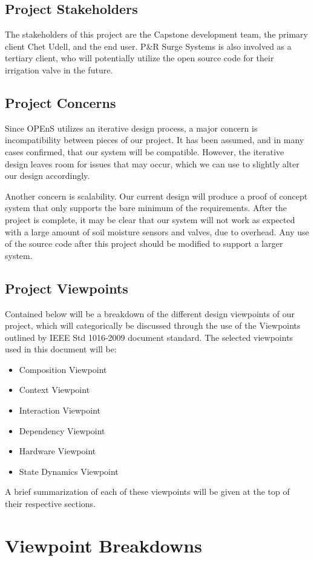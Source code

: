 \documentclass[onecolumn, draftclsnofoot,10pt, compsoc]{IEEEtran}
\begin{document}
	\subsection{Project Stakeholders}
	The stakeholders of this project are the Capstone development team, the primary client Chet Udell, and the end user. 
	P\&R Surge Systems is also involved as a tertiary client, who will potentially utilize the open source code for their irrigation valve in the future. 
	\subsection{Project Concerns}
	Since OPEnS utilizes an iterative design process, a major concern is incompatibility between pieces of our project. 
	It has been assumed, and in many cases confirmed, that our system will be compatible. 
	However, the iterative design leaves room for issues that may occur, which we can use to slightly alter our design accordingly.
	
	Another concern is scalability.
	Our current design will produce a proof of concept system that only supports the bare minimum of the requirements. 
	After the project is complete, it may be clear that our system will not work as expected with a large amount of soil moisture sensors and valves, due to overhead. 
	Any use of the source code after this project should be modified to support a larger system. 
	\subsection{Project Viewpoints}
	Contained below will be a breakdown of the different design viewpoints of our project, which will categorically be discussed through the use of the Viewpoints outlined by IEEE Std 1016-2009 document standard.
	The selected viewpoints used in this document will be:
	\begin{itemize}
		\item Composition Viewpoint
		\item Context Viewpoint
		\item Interaction Viewpoint
		\item Dependency Viewpoint
		\item Hardware Viewpoint
		\item State Dynamics Viewpoint
	\end{itemize}
	A brief summarization of each of these viewpoints will be given at the top of their respective sections.
	
	
	\section{Viewpoint Breakdowns}
\end{document}
